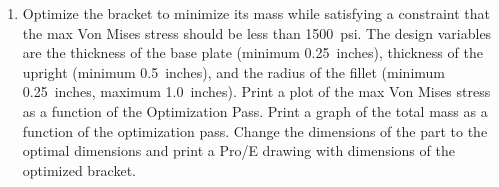 \documentclass[12pt]{article}
\begin{document}
\begin{enumerate}
	\vspace{.25in}

	\item Optimize the bracket to minimize its mass while satisfying a constraint that the max Von Mises stress should be less than 1500~psi. The design variables are the thickness of the base plate (minimum 0.25~inches), thickness of the upright (minimum 0.5~inches), and the radius of the fillet (minimum 0.25~inches, maximum 1.0~inches). Print a plot of the max Von Mises stress as a function of the Optimization Pass. Print a graph of the total mass as a function of the optimization pass. Change the dimensions of the part to the optimal dimensions and print a Pro/E drawing with dimensions of the optimized bracket.

\end{enumerate}
\end{document}

